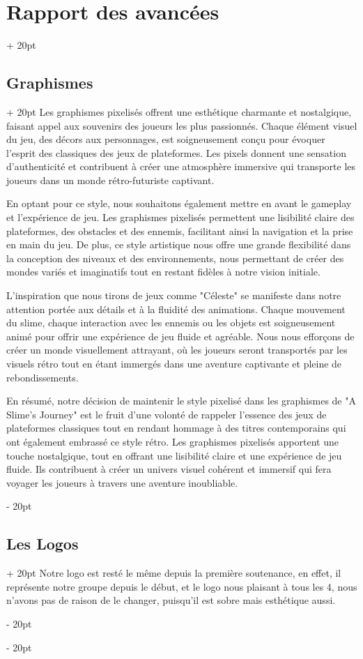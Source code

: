 \documentclass[a4paper, 12pt, twoside]{article}
\newcommand{\ind}[1][20pt]{\advance\leftskip + #1}
\newcommand{\deind}[1][20pt]{\advance\leftskip - #1}
\newenvironment{indt}[2][20pt]{#2 \par \ind[#1]}{\par \deind} %
\begin{document}
\begin{indt}{\section{Rapport des avancées}}
\begin{indt}{\subsection{Graphismes}}
            Les graphismes pixelisés offrent une esthétique charmante et nostalgique, faisant appel aux souvenirs des joueurs les plus passionnés. Chaque élément visuel du jeu, des décors aux personnages, est soigneusement conçu pour évoquer l'esprit des classiques des jeux de plateformes. Les pixels donnent une sensation d'authenticité et contribuent à créer une atmosphère immersive qui transporte les joueurs dans un monde rétro-futuriste captivant.

            En optant pour ce style, nous souhaitons également mettre en avant le gameplay et l'expérience de jeu. Les graphismes pixelisés permettent une lisibilité claire des plateformes, des obstacles et des ennemis, facilitant ainsi la navigation et la prise en main du jeu. De plus, ce style artistique nous offre une grande flexibilité dans la conception des niveaux et des environnements, nous permettant de créer des mondes variés et imaginatifs tout en restant fidèles à notre vision initiale.

            L'inspiration que nous tirons de jeux comme "Céleste" se manifeste dans notre attention portée aux détails et à la fluidité des animations. Chaque mouvement du slime, chaque interaction avec les ennemis ou les objets est soigneusement animé pour offrir une expérience de jeu fluide et agréable. Nous nous efforçons de créer un monde visuellement attrayant, où les joueurs seront transportés par les visuels rétro tout en étant immergés dans une aventure captivante et pleine de rebondissements.

            En résumé, notre décision de maintenir le style pixelisé dans les graphismes de "A Slime's Journey" est le fruit d'une volonté de rappeler l'essence des jeux de plateformes classiques tout en rendant hommage à des titres contemporains qui ont également embrassé ce style rétro. Les graphismes pixelisés apportent une touche nostalgique, tout en offrant une lisibilité claire et une expérience de jeu fluide. Ils contribuent à créer un univers visuel cohérent et immersif qui fera voyager les joueurs à travers une aventure inoubliable.
        \end{indt}

        \begin{indt}{\subsection{Les Logos}}
            Notre logo est resté le même depuis la première soutenance, en effet, il représente notre groupe depuis le début, et le logo nous plaisant à tous les 4, nous n’avons pas de raison de le changer, puisqu’il est sobre mais esthétique aussi.


\end{indt}
\end{indt}
\end{document}
